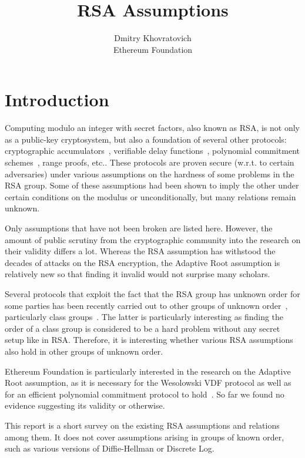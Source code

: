 \documentclass[a4paper]{article}
\title{RSA Assumptions}
\author{Dmitry Khovratovich\\Ethereum Foundation}
\begin{document}
\maketitle

\section{Introduction}

Computing modulo an integer with secret factors, also known as RSA, is not only as a public-key cryptosystem, but also  a foundation of several other protocols: cryptographic accumulators~\cite{DBLP:conf/crypto/CamenischL02}, verifiable delay functions~\cite{DBLP:conf/eurocrypt/Wesolowski19,DBLP:conf/crypto/BonehBBF18}, polynomial commitment schemes~\cite{cryptoeprint:2019:1229}, range proofs, etc.. These protocols are proven secure (w.r.t. to certain adversaries) under various assumptions on the hardness of some problems in the RSA group.  Some of these assumptions had been shown to imply the other under certain conditions on the modulus or unconditionally, but many relations remain unknown. 

Only assumptions that have not been broken are listed here. However, the amount of public scrutiny from the cryptographic community into the research on their validity differs a lot. Whereas the RSA assumption has withstood the decades of attacks on the RSA encryption, the Adaptive Root assumption is relatively new so that finding it invalid would not surprise many scholars.

Several protocols that exploit the fact that the RSA group has unknown order for some parties has been recently carried out to other groups of unknown order~\cite{DBLP:conf/crypto/BonehBBF18,cryptoeprint:2019:1229}, particularly class groups~\cite{buchmann2001survey}. The latter is particularly interesting as finding the order of a class group is considered to be a hard problem without any secret setup like in RSA. Therefore, it is interesting whether various RSA assumptions also hold in other groups of unknown order.

Ethereum Foundation is particularly interested in the research on the Adaptive Root assumption, as it is necessary for the Wesolowski VDF protocol as well as for an efficient polynomial commitment protocol to hold~\cite{DBLP:conf/eurocrypt/Wesolowski19,cryptoeprint:2019:1229}. So far we found no evidence suggesting its validity or otherwise.

This report is a short survey on the existing RSA assumptions and relations among them. It does not cover assumptions arising in  groups of known order, such as various versions of Diffie-Hellman or Discrete Log. 
\end{document}
